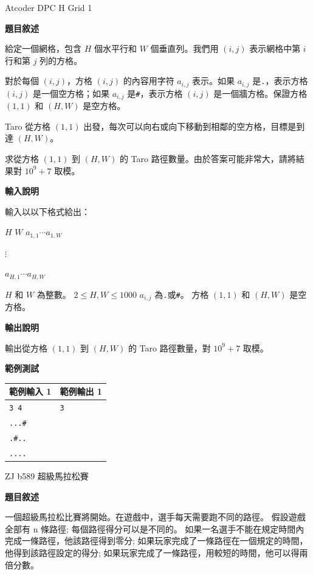    \problem Atcoder DPC H Grid 1

    \textbf{題目敘述}

    給定一個網格，包含 $H$ 個水平行和 $W$ 個垂直列。我們用 $(i,j)$ 表示網格中第 $i$ 行和第 $j$ 列的方格。

    對於每個 $(i,j)$，方格 $(i,j)$ 的內容用字符 $a_{i,j}$ 表示。如果 $a_{i,j}$ 是\verb|.|，表示方格 $(i,j)$ 是一個空方格；如果 $a_{i,j}$ 是\verb|#|，表示方格 $(i,j)$ 是一個牆方格。保證方格 $(1,1)$ 和 $(H,W)$ 是空方格。

    Taro 從方格 $(1,1)$ 出發，每次可以向右或向下移動到相鄰的空方格，目標是到達 $(H,W)$。

    求從方格 $(1,1)$ 到 $(H,W)$ 的 Taro 路徑數量。由於答案可能非常大，請將結果對 $10^9 + 7$ 取模。

    \textbf{輸入說明}

    輸入以以下格式給出：

    $H$
    $W$
    $a_{1,1} \cdots a_{1,W}$
    
    $\vdots$
    
    $a_{H,1} \cdots a_{H,W}$

    $H$ 和 $W$ 為整數。
    $2 \le H, W \le 1000$
    $a_{i,j}$ 為\verb|.|或\verb|#|。
    方格 $(1,1)$ 和 $(H,W)$ 是空方格。

    \textbf{輸出說明}

    輸出從方格 $(1,1)$ 到 $(H,W)$ 的 Taro 路徑數量，對 $10^9 + 7$ 取模。

    \textbf{範例測試}

    \begin{tabular}{|m{7cm}|m{7cm}|}
        \hline
        範例輸入 1 & 範例輸出 1 \\
        \hline
        \verb|3 4| & \verb|3| \\
        \verb|...#| & \\
        \verb|.#..| & \\
        \verb|....| & \\
        \hline
    \end{tabular}

    \problem ZJ b589 超級馬拉松賽

    \textbf{題目敘述}

    一個超級馬拉松比賽將開始。在遊戲中，選手每天需要跑不同的路徑。
    假設遊戲全部有 n 條路徑; 每個路徑得分可以是不同的。
    如果一名選手不能在規定時間內完成一條路徑，他該路徑得到零分;
    如果玩家完成了一條路徑在一個規定的時間，他得到該路徑設定的得分;
    如果玩家完成了一條路徑，用較短的時間，他可以得兩倍分數。

